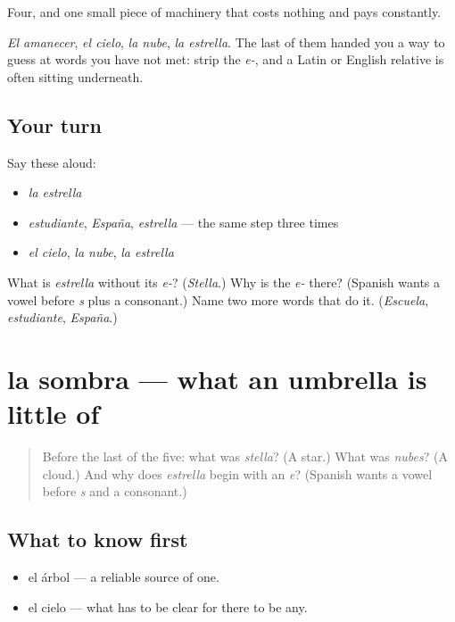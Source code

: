 \begin{grammarlens}[title={What you've built}]
Four, and one small piece of machinery that costs nothing and pays constantly.

\emph{El amanecer}, \emph{el cielo}, \emph{la nube}, \emph{la estrella}. The last of them handed you a way to guess at words you have not met: strip the \emph{e-}, and a Latin or English relative is often sitting underneath.
\end{grammarlens}

\subsection*{Your turn}
Say these aloud:

\begin{itemize}
\raggedright
  \item \emph{la estrella}
  \item \emph{estudiante}, \emph{España}, \emph{estrella} — the same step three times
  \item \emph{el cielo}, \emph{la nube}, \emph{la estrella}
\end{itemize}

\begin{tcolorbox}[breakable,colback=teal!4,colframe=teal!35!black,title={Before you move on}]
What is \emph{estrella} without its \emph{e-}? (\emph{Stella}.) Why is the \emph{e-} there? (Spanish wants a vowel before \emph{s} plus a consonant.) Name two more words that do it. (\emph{Escuela}, \emph{estudiante}, \emph{España}.)
\end{tcolorbox}
\section[la sombra]{la sombra — what an umbrella is little of}

\label{lesson:ES-C289-sombra}



\begin{quote}
Before the last of the five: what was \emph{stella}? (A star.) What was \emph{nubes}? (A cloud.) And why does \emph{estrella} begin with an \emph{e}? (Spanish wants a vowel before \emph{s} and a consonant.)
\end{quote}

\subsection*{What to know first}
\begin{itemize}
\raggedright
  \item el árbol — a reliable source of one.
  \item el cielo — what has to be clear for there to be any.
\end{itemize}

